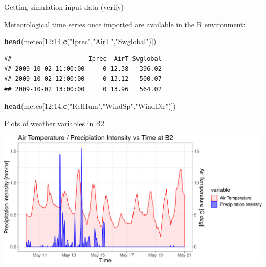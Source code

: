 \documentclass[ignorenonframetext,]{beamer}
\newenvironment{Shaded}{\begin{snugshade}}{\end{snugshade}}
\newcommand{\KeywordTok}[1]{\textcolor[rgb]{0.13,0.29,0.53}{\textbf{#1}}}
\newcommand{\DecValTok}[1]{\textcolor[rgb]{0.00,0.00,0.81}{#1}}
\newcommand{\StringTok}[1]{\textcolor[rgb]{0.31,0.60,0.02}{#1}}
\newcommand{\OperatorTok}[1]{\textcolor[rgb]{0.81,0.36,0.00}{\textbf{#1}}}
\newcommand{\NormalTok}[1]{#1}
\begin{document}
\begin{frame}[fragile]{Getting simulation input data (verify)}

Meteorological time series once imported are available in the R
environment:

\begin{Shaded}
\begin{Highlighting}[]
\KeywordTok{head}\NormalTok{(meteo[}\DecValTok{12}\OperatorTok{:}\DecValTok{14}\NormalTok{,}\KeywordTok{c}\NormalTok{(}\StringTok{"Iprec"}\NormalTok{,}\StringTok{"AirT"}\NormalTok{,}\StringTok{"Swglobal"}\NormalTok{)])}
\end{Highlighting}
\end{Shaded}

\begin{verbatim}
##                     Iprec  AirT Swglobal
## 2009-10-02 11:00:00     0 12.38   396.02
## 2009-10-02 12:00:00     0 13.12   500.07
## 2009-10-02 13:00:00     0 13.96   564.02
\end{verbatim}

\begin{Shaded}
\begin{Highlighting}[]
\KeywordTok{head}\NormalTok{(meteo[}\DecValTok{12}\OperatorTok{:}\DecValTok{14}\NormalTok{,}\KeywordTok{c}\NormalTok{(}\StringTok{"RelHum"}\NormalTok{,}\StringTok{"WindSp"}\NormalTok{,}\StringTok{"WindDir"}\NormalTok{)])}
\end{Highlighting}
\end{Shaded}

\end{frame}

\begin{frame}{Plots of weather variables in B2}

\includegraphics{presentation_files/figure-beamer/unnamed-chunk-5-1.pdf}

\end{frame}
\end{document}

